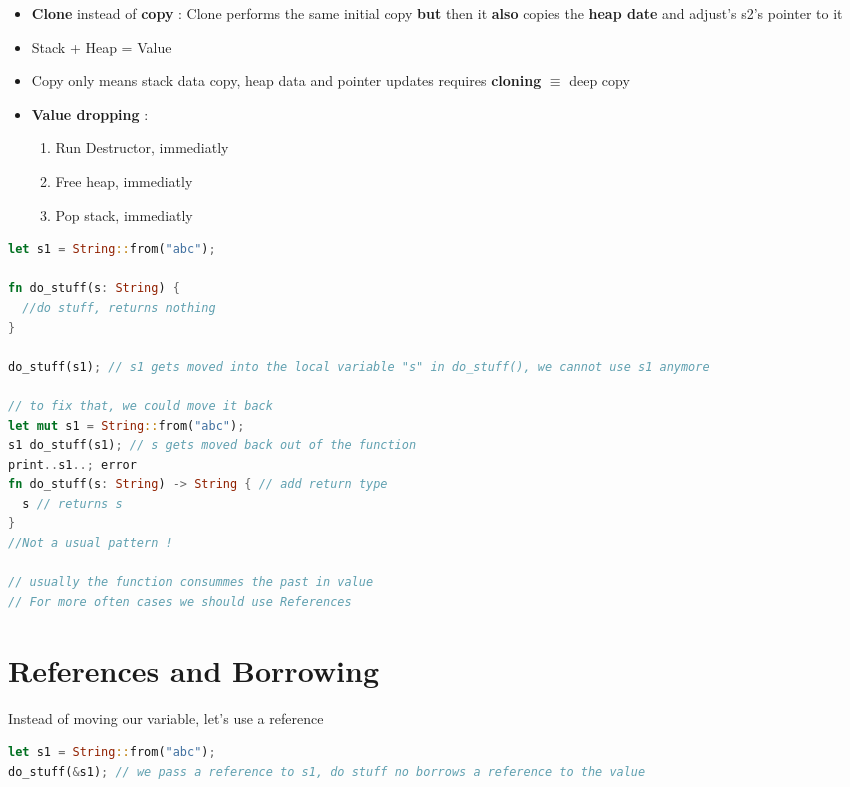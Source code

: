 \documentclass{report}
\begin{document}
\begin{multicols*}{2}
\begin{itemize}
  \item \textbf{Clone} instead of \textbf{copy} : Clone performs the same initial copy
    \textbf{but} then it \textbf{also} copies the \textbf{heap date} and adjust's s2's pointer to it 
    \item Stack + Heap = Value 
    \item Copy only means stack data copy, heap data and pointer updates requires \textbf{cloning} $\equiv $ deep copy 
    \item \textbf{Value dropping} :
      \begin{enumerate}
        \item Run Destructor, immediatly 
        \item Free heap, immediatly 
        \item Pop stack, immediatly
      \end{enumerate}
\end{itemize}

\begin{tcolorbox}[title=Another move situation,colback=backcolour,size=small,left=4mm]
\begin{lstlisting}[language=rust]
let s1 = String::from("abc");

fn do_stuff(s: String) {
  //do stuff, returns nothing
}

do_stuff(s1); // s1 gets moved into the local variable "s" in do_stuff(), we cannot use s1 anymore

// to fix that, we could move it back
let mut s1 = String::from("abc"); 
s1 do_stuff(s1); // s gets moved back out of the function
print..s1..; error
fn do_stuff(s: String) -> String { // add return type 
  s // returns s
}
//Not a usual pattern !

// usually the function consummes the past in value
// For more often cases we should use References

\end{lstlisting}
\end{tcolorbox}

\section{References and Borrowing}

Instead of moving our variable, let's use a reference
\begin{tcolorbox}[colback=backcolour,size=small,left=4mm]
\begin{lstlisting}[language=rust]
let s1 = String::from("abc");
do_stuff(&s1); // we pass a reference to s1, do stuff no borrows a reference to the value


\end{lstlisting}
\end{tcolorbox}
\end{multicols*}
\end{document}
